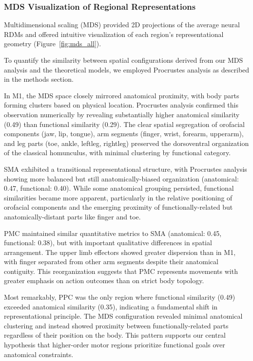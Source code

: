 \documentclass{article}
\begin{document}
\subsubsection{MDS Visualization of Regional Representations}

Multidimensional scaling (MDS) provided 2D projections of the average neural RDMs and offered intuitive visualization of each region's representational geometry (Figure~\ref{fig:mds_all}). 

To quantify the similarity between spatial configurations derived from our MDS analysis and the theoretical models, we employed Procrustes analysis as described in the methods section.

In M1, the MDS space closely mirrored anatomical proximity, with body parts forming clusters based on physical location. Procrustes analysis confirmed this observation numerically by revealing substantially higher anatomical similarity (0.49) than functional similarity (0.29). The clear spatial segregation of orofacial components (jaw, lip, tongue), arm segments (finger, wrist, forearm, upperarm), and leg parts (toe, ankle, leftleg, rightleg) preserved the dorsoventral organization of the classical homunculus, with minimal clustering by functional category.

SMA exhibited a transitional representational structure, with Procrustes analysis showing more balanced but still anatomically-biased organization (anatomical: 0.47, functional: 0.40). While some anatomical grouping persisted, functional similarities became more apparent, particularly in the relative positioning of orofacial components and the emerging proximity of functionally-related but anatomically-distant parts like finger and toe.

PMC maintained similar quantitative metrics to SMA (anatomical: 0.45, functional: 0.38), but with important qualitative differences in spatial arrangement. The upper limb effectors showed greater dispersion than in M1, with finger separated from other arm segments despite their anatomical contiguity. This reorganization suggests that PMC represents movements with greater emphasis on action outcomes than on strict body topology.

Most remarkably, PPC was the only region where functional similarity (0.49) exceeded anatomical similarity (0.35), indicating a fundamental shift in representational principle. The MDS configuration revealed minimal anatomical clustering and instead showed proximity between functionally-related parts regardless of their position on the body. This pattern supports our central hypothesis that higher-order motor regions prioritize functional goals over anatomical constraints.
\end{document}
